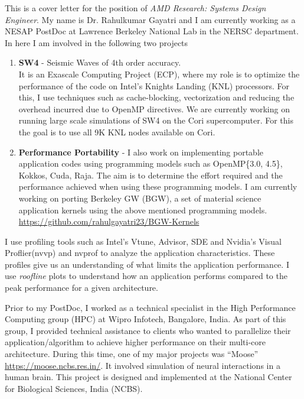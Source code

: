 \documentclass[10pt,stdletter,dateno]{newlfm}
\begin{document}
\begin{newlfm}
%
    This is a cover letter for the position of \textit{AMD Research: Systems Design Engineer}.
    My name is Dr. Rahulkumar Gayatri and I am currently working as a NESAP PostDoc at Lawrence Berkeley National Lab in the NERSC department.
    In here I am involved in the following two projects
\begin{enumerate}
    \item {\bf SW4} - Seismic Waves of 4th order accuracy. \\
        It is an Exascale Computing Project (ECP), where my role is to optimize the  performance of the code on Intel's Knights Landing (KNL) processors.
        For this, I use techniques such as cache-blocking, vectorization and reducing the overhead incurred due to OpenMP directives.
        We are currently working on running large scale simulations of SW4 on the Cori supercomputer. For this the goal is to use all 9K KNL nodes available on Cori.
%
    \item {\bf Performance Portability} - I also work on implementing portable application codes using programming models such as OpenMP\{3.0, 4.5\}, Kokkos, Cuda, Raja.
        The aim is to determine the effort required and the performance achieved when using these programming models.
        I am currently working on porting Berkeley GW (BGW), a set of material science application kernels using the above mentioned programming models.
        \url{https://github.com/rahulgayatri23/BGW-Kernels}
\end{enumerate}
    I use profiling tools such as Intel's Vtune, Advisor, SDE and Nvidia's Visual Proflier(nvvp) and nvprof to analyze the application characteristics.
    These profiles give us an understanding of what limits the application performance.
    I use {\it roofline} plots to understand how an application performs compared to the peak performance for a given architecture.
%
    \par
    Prior to my PostDoc, I worked as a technical specialist in the High Performance Computing group (HPC) at Wipro Infotech, Bangalore, India.
    As part of this group, I provided technical assistance to clients who wanted to parallelize their application/algorithm to achieve higher performance on their multi-core architecture.
    During this time, one of my major projects was \enquote{Moose} \url{https://moose.ncbs.res.in/}.
    It involved simulation of neural interactions in a human brain.
    This project is designed and implemented at the National Center for Biological Sciences, India (NCBS).

\end{newlfm}
\end{document}
